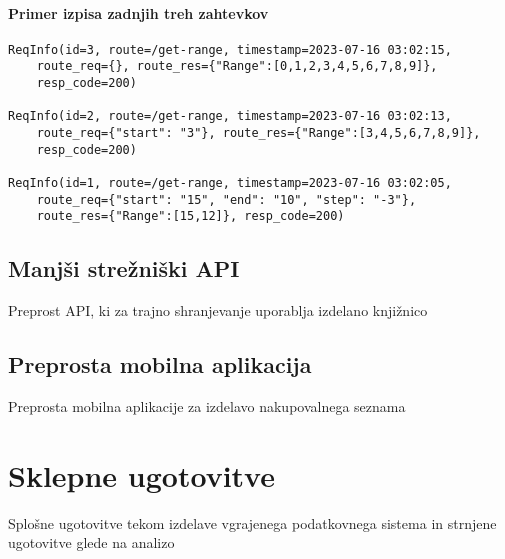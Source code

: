 \documentclass[a4paper,12pt,openright]{book}
\begin{document}
    \subsubsection{Primer izpisa zadnjih treh zahtevkov}

\begin{verbatim}
ReqInfo(id=3, route=/get-range, timestamp=2023-07-16 03:02:15, 
    route_req={}, route_res={"Range":[0,1,2,3,4,5,6,7,8,9]},
    resp_code=200)
    
ReqInfo(id=2, route=/get-range, timestamp=2023-07-16 03:02:13, 
    route_req={"start": "3"}, route_res={"Range":[3,4,5,6,7,8,9]},
    resp_code=200)
    
ReqInfo(id=1, route=/get-range, timestamp=2023-07-16 03:02:05,
    route_req={"start": "15", "end": "10", "step": "-3"},
    route_res={"Range":[15,12]}, resp_code=200)
\end{verbatim}

    \section{Manjši strežniški API}
    \colorbox{BurntOrange}{Preprost API, ki za trajno shranjevanje uporablja izdelano knjižnico}
    
    \section{Preprosta mobilna aplikacija}
    \colorbox{BurntOrange}{Preprosta mobilna aplikacije za izdelavo nakupovalnega seznama}

\chapter{Sklepne ugotovitve}
    \colorbox{BurntOrange}{Splošne ugotovitve tekom izdelave vgrajenega podatkovnega sistema}
    \newline
    \colorbox{BurntOrange}{in strnjene ugotovitve glede na analizo}


\raggedright

\printbibliography[heading=bibintoc,title={Literatura}]
\end{document}
